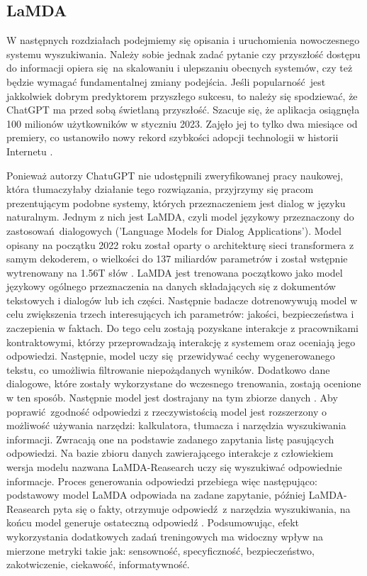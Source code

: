 \subsection{LaMDA}

W następnych rozdziałach podejmiemy się opisania i uruchomienia nowoczesnego systemu wyszukiwania. Należy sobie jednak zadać pytanie czy przyszłość dostępu do informacji opiera się na skalowaniu i ulepszaniu obecnych systemów, czy też będzie wymagać fundamentalnej zmiany podejścia. Jeśli popularność jest jakkolwiek dobrym predyktorem przyszłego sukcesu, to należy się spodziewać, że ChatGPT ma przed sobą świetlaną przyszłość. Szacuje się, że aplikacja osiągnęła 100 milionów użytkowników w styczniu 2023. Zajęło jej to tylko dwa miesiące od premiery, co ustanowiło nowy rekord szybkości adopcji technologii w historii Internetu \autocite{chatgpt100musers}. \newline

Ponieważ autorzy ChatuGPT nie udostępnili zweryfikowanej pracy naukowej, która tłumaczyłaby działanie tego rozwiązania, przyjrzymy się pracom prezentującym podobne systemy, których przeznaczeniem jest dialog w języku naturalnym. Jednym z nich jest LaMDA, czyli model językowy przeznaczony do zastosowań dialogowych ('Language Models for Dialog Applications'). Model opisany na początku 2022 roku został oparty o architekturę sieci transformera z samym dekoderem, o wielkości do 137 miliardów parametrów i został wstępnie wytrenowany na 1.56T słów \autocite{thoppilan2022lamda}. LaMDA jest trenowana początkowo jako model językowy ogólnego przeznaczenia na danych składających się z dokumentów tekstowych i dialogów lub ich części. Następnie badacze dotrenowywują model w celu zwiększenia trzech interesujących ich parametrów: jakości, bezpieczeństwa i zaczepienia w faktach. Do tego celu zostają pozyskane interakcje z pracownikami kontraktowymi, którzy przeprowadzają interakcję z systemem oraz oceniają jego odpowiedzi. Następnie, model uczy się przewidywać cechy wygenerowanego tekstu, co umożliwia filtrowanie niepożądanych wyników. Dodatkowo dane dialogowe, które zostały wykorzystane do wczesnego trenowania, zostają ocenione w ten sposób. Następnie model jest dostrajany na tym zbiorze danych \autocite{thoppilan2022lamda}. Aby poprawić zgodność odpowiedzi z rzeczywistością model jest rozszerzony o możliwość używania narzędzi: kalkulatora, tłumacza i narzędzia wyszukiwania informacji. Zwracają one na podstawie zadanego zapytania listę pasujących odpowiedzi. Na bazie zbioru danych zawierającego interakcje z człowiekiem wersja modelu nazwana LaMDA-Reasearch uczy się wyszukiwać odpowiednie informacje. Proces generowania odpowiedzi przebiega więc następująco: podstawowy model LaMDA odpowiada na zadane zapytanie, później LaMDA-Reasearch pyta się o fakty, otrzymuje odpowiedź z narzędzia wyszukiwania, na końcu model generuje ostateczną odpowiedź \autocite{thoppilan2022lamda}. Podsumowując, efekt wykorzystania dodatkowych zadań treningowych ma widoczny wpływ na mierzone metryki takie jak: sensowność, specyficzność, bezpieczeństwo, zakotwiczenie, ciekawość, informatywność. \newline

